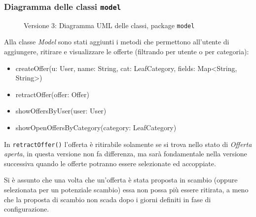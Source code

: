 \subsubsection{Diagramma delle classi \texttt{model}}
\vspace{0.5cm}
\begin{figure}[H]
    \centering
    \caption{Versione 3: Diagramma UML delle classi, package \texttt{model}}
    \label{fig:class_model_v_3}
\end{figure}

Alla classe \textit{Model} sono stati aggiunti i metodi che permettono all'utente di aggiungere, ritirare e visualizzare le offerte (filtrando per utente o per categoria):
\begin{itemize}
    \item createOffer(u: User, name: String, cat: LeafCategory, fields: Map<String, String>)
    \item retractOffer(offer: Offer)
    \item showOffersByUser(user: User)
    \item showOpenOffersByCategory(category: LeafCategory)
\end{itemize}

In \texttt{retractOffer()} l'offerta è ritirabile solamente se si trova nello stato di \textit{Offerta aperta},
in questa versione non fa differenza, ma sarà fondamentale nella versione successiva quando le offerte potranno essere
selezionate ed accoppiate.

Si è assunto che una volta che un'offerta è stata proposta in scambio (oppure selezionata per un potenziale scambio)
essa non possa più essere ritirata, a meno che la proposta di scambio non scada dopo i giorni definiti in fase di configurazione.